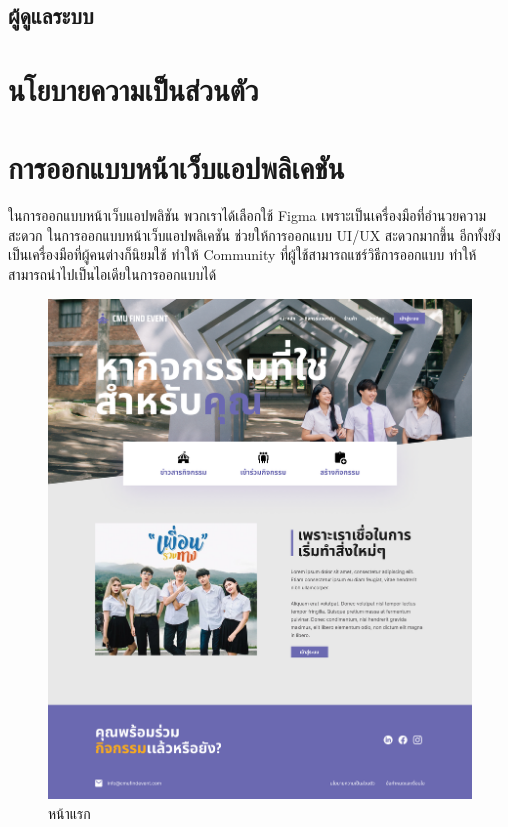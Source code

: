 \subsection{ผู้ดูแลระบบ}
\section{นโยบายความเป็นส่วนตัว}

\section{การออกแบบหน้าเว็บแอปพลิเคชัน}
ในการออกแบบหน้าเว็บแอปพลิชัน พวกเราได้เลือกใช้ Figma เพราะเป็นเครื่องมือที่อำนวยความสะดวก ในการออกแบบหน้าเว็บแอปพลิเคชัน ช่วยให้การออกแบบ UI/UX สะดวกมากขึ้น อีกทั้งยังเป็นเครื่องมือที่ผู้คนต่างก็นิยมใช้
ทำให้ Community ที่ผู้ใช้สามารถแชร์วิธีการออกแบบ ทำให้สามารถนำไปเป็นไอเดียในการออกแบบได้ 
\begin{figure}[h]
\begin{center}
\includegraphics[width=0.5\linewidth]{image/Figma-design/Main-not-login.png}
\end{center}
\caption[Poem]{หน้าแรก}
\label{fig:main}
\end{figure}

